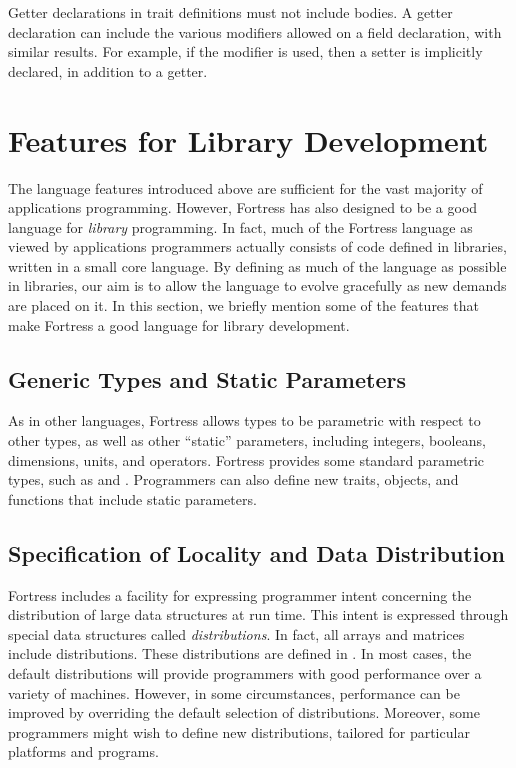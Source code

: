 Getter declarations in trait definitions must not include bodies.
A getter declaration can include the various modifiers
allowed on a field declaration, with similar results.
For example, if the modifier  is used, then a
setter is implicitly declared, in addition to a getter.

\section{Features for Library Development}
The language features introduced above are sufficient for the vast majority of applications programming. However, Fortress
has also designed to be a good language for \emph{library} programming. In fact, much of the Fortress language as viewed
by applications programmers actually consists of code defined in libraries, written in a small core language. By defining as
much of the language as possible in libraries, our aim is to allow the language to evolve gracefully as new demands are placed on it.
In this section, we briefly mention some of the features that make Fortress a good language for library development.

\subsection{Generic Types and Static Parameters}
As in other languages, Fortress allows types to be parametric with respect to other types, as well as other ``static'' parameters,
including integers, booleans, dimensions, units, and operators.
Fortress provides some standard parametric types,
such as  and .
Programmers can also define new traits, objects, and functions that include static parameters.

\subsection{Specification of Locality and Data Distribution}
Fortress includes a facility for expressing programmer intent concerning the distribution of large data structures
at run time. This intent is expressed through special data structures called \emph{distributions}.
In fact, all arrays and matrices include distributions. These distributions
are defined in \library.
In most cases, the default distributions
will provide programmers with good performance over a variety of machines. However, in some circumstances,
performance can be improved by overriding the default selection of distributions.
Moreover, some programmers might wish to define new distributions, tailored for particular
platforms and programs.

